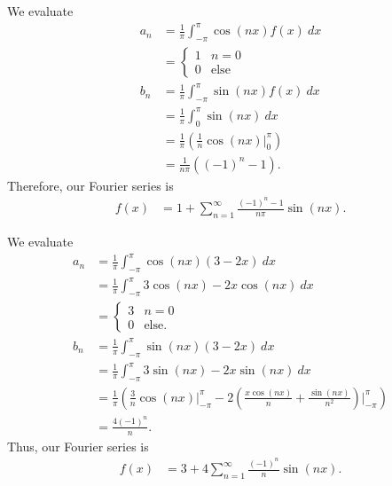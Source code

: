 \documentclass[10pt]{mypackage}
\begin{document}
\RaggedRight
\begin{solution}[11.2, Problem 2]
  We evaluate
  \begin{align*}
    a_n &= \frac{1}{\pi}\int_{-\pi}^{\pi} \cos\left( nx \right)f(x)\:dx\\
        &= \begin{cases}
          1 & n = 0\\
          0 & \text{else}
        \end{cases}\\
    b_n &= \frac{1}{\pi}\int_{-\pi}^{\pi} \sin\left( nx \right)f(x)\:dx\\
        &= \frac{1}{\pi}\int_{0}^{\pi} \sin\left( nx \right)\:dx\\
        &= \frac{1}{\pi}\left( \frac{1}{n}\cos\left( nx \right)\biggr\vert_{0}^{\pi} \right)\\
        &= \frac{1}{n\pi}\left( \left( -1 \right)^{n}-1 \right).
  \end{align*}
  Therefore, our Fourier series is
  \begin{align*}
    f(x) &= 1 + \sum_{n=1}^{\infty}\frac{\left( -1 \right)^{n}-1}{n\pi} \sin\left( nx \right).
  \end{align*}
\end{solution}
\begin{solution}[11.2, Problem 8]
  We evaluate
  \begin{align*}
    a_n &= \frac{1}{\pi}\int_{-\pi}^{\pi} \cos\left( nx \right)\left( 3-2x \right)\:dx\\
        &= \frac{1}{\pi} \int_{-\pi}^{\pi} 3\cos\left( nx \right) - 2x\cos\left( nx \right)\:dx\\
        &= \begin{cases}
          3 & n = 0\\
          0 & \text{else}.
        \end{cases}\\
    b_n &= \frac{1}{\pi} \int_{-\pi}^{\pi} \sin\left( nx \right)\left( 3-2x \right)\:dx\\
        &= \frac{1}{\pi} \int_{-\pi}^{\pi} 3\sin\left( nx \right) - 2x\sin\left( nx \right)\:dx\\
        &= \frac{1}{\pi}\left( \frac{3}{n}\cos\left( nx \right)\biggr\vert_{-\pi}^{\pi} - 2\left( \frac{x\cos\left( nx \right)}{n} + \frac{\sin\left( nx \right)}{n^2} \right)\biggr\vert_{-\pi}^{\pi}\right)\\
        &= \frac{4\left( -1 \right)^{n}}{n}.
  \end{align*}
  Thus, our Fourier series is
  \begin{align*}
    f(x) &= 3 + 4\sum_{n=1}^{\infty}\frac{\left( -1 \right)^{n}}{n}\sin\left( nx \right).
  \end{align*}
\end{solution}
\end{document}
